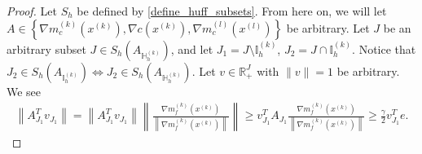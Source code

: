 \documentclass{article}
\theoremstyle{case}
\numberwithin{theorem}{subsection}
\newcommand{\gk}{{\nabla m_f^{(k)}\left(\xk\right)}}
\newcommand{\xk}{x^{(k)}}
\newcommand{\xl}{{x^{(l)}}}
\newcommand{\activeindicesk}{{ \mathbb I_h^{(k)} }}
\newcommand{\huffindicesk}{{ \mathbb H_h^{(k)} }}
\newcommand{\modeljack}{{ \nabla m^{(k)}_{c}\left(\xk\right) }}
\newcommand{\modeljacl}{{ \nabla m^{(l)}_{c}\left(\xl\right) }}
\newcommand{\truejack}{{ \nabla c\left(\xk\right) }}
\begin{document}
\begin{proof}
Let $S_h$ be defined by \cref{define_huff_subsets}.
From here on, we will let 
$A \in \left\{
\modeljack,
\truejack,
\modeljacl
\right\}$ be arbitrary.
Let $J$ be an arbitrary subset $J \in S_h\left(A_{\huffindicesk}\right)$,
and let $J_1 = J \setminus \activeindicesk $, $J_2 = J \cap \activeindicesk$.
Notice that $J_2 \in S_h\left(A_{\activeindicesk}\right) \Longleftrightarrow J_2 \in S_h\left(A_{\huffindicesk}\right)$.
Let $v \in \mathbb R^{J}_+$ with $\|v\| = 1$ be arbitrary.
We see
\begin{align*}
\left\|A_{J_1}^Tv_{J_1}\right\| 
= \left\|A_{J_1}^Tv_{J_1}\right\| \left\|\frac{\gk}{\left\|\gk\right\|} \right\| 
\ge v_{J_1}^TA_{J_1}\frac{\gk}{\left\|\gk\right\|}
\ge \frac {\gamma} {2}  v_{J_1}^Te.
\end{align*}






\end{proof}
\end{document}
